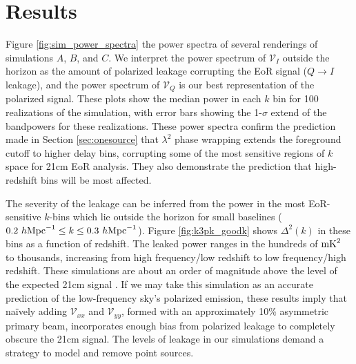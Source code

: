\section{Results}
\label{sec:sim_results}


Figure \ref{fig:sim_power_spectra} the power spectra of several renderings of simulations 
$A$, $B$, and $C$. We interpret the power spectrum of $\mathcal{V}_I$ outside the horizon 
as the amount of polarized leakage corrupting the EoR signal ($Q\to I$ leakage), and the 
power spectrum of $\mathcal{V}_Q$ is our best representation of the polarized signal. These 
plots show the median power in each $k$ bin for 100 realizations of the simulation, with error bars
showing the 1-$\sigma$ extend of the bandpowers for these realizations. These power spectra confirm
the prediction made in Section \ref{sec:onesource} that $\lambda^2$ phase wrapping extends the
foreground cutoff \cite[][e.g.]{PAPERSensitivity, Pober2013} to higher delay bins, corrupting some of the
most sensitive regions of $k$ space for 21cm EoR analysis. They also demonstrate the prediction that
high-redshift bins will be most affected.

The severity of the leakage can be inferred from the power in the most EoR-sensitive $k$-bins which lie
outside the horizon for small baselines ($0.2\ h{\rm Mpc}^{-1} \le k \le 0.3\ h{\rm Mpc}^{-1}$). Figure 
\ref{fig:k3pk_goodk} shows $\Delta^2(k)$ in these bins as a function of redshift. The leaked power 
ranges in the hundreds of $\rm{mK}^2$ to thousands, increasing from high frequency/low
redshift to low frequency/high redshift. These simulations are about an order of magnitude above the
level of the expected 21cm signal \cite{Lidz2008}. If we may take this simulation as an accurate
prediction of the low-frequency sky's polarized emission, these results imply that na\"{i}vely
adding $\mathcal{V}_{xx}$ and $\mathcal{V}_{yy}$, formed with an approximately 10\% asymmetric
primary beam, incorporates enough bias from polarized leakage to completely obscure the 21cm signal.
The levels of leakage in our simulations demand a strategy to model and remove point sources.

